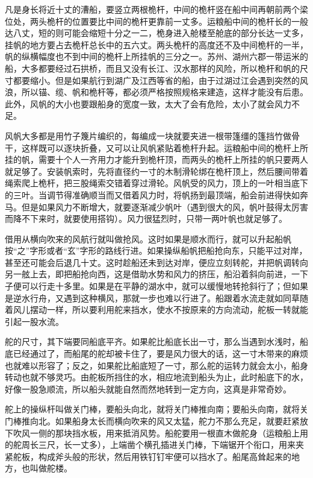 \documentclass[12pt,UTF8]{ctexbook}
\begin{document}
凡是身长将近十丈的漕船，要竖立两根桅杆，中间的桅杆竖在船中间再朝前两个梁位处，两头桅杆的位置要比中间的桅杆更靠前一丈多。运粮船中间的桅杆长的一般达八丈，短的则可能会缩短十分之一二，桅身进入舱楼至舱底的部分长达一丈多，挂帆的地方要占去桅杆总长中的五六丈。两头桅杆的高度还不及中间桅杆的一半，帆的纵横幅度也不到中间的桅杆上所挂帆的三分之一。苏州、湖州六郡一带运米的船，大多都要经过石拱桥，而且又没有长江、汉水那样的风险，所以桅杆和帆的尺寸都要缩小。但是如果航行到湖广及江西等省的船，由于过湖过江会遇到突然的风浪，所以锚、缆、帆和桅杆等，都必须严格按照规格来建造，这样才能没有后患。此外，风帆的大小也要跟船身的宽度一致，太大了会有危险，太小了就会风力不足。

风帆大多都是用竹子篾片编织的，每编成一块就要夹进一根带篷缰的篷挡竹做骨干，这样既可以逐块折叠，又可以让风帆紧贴着桅杆升起。运粮船中间的桅杆上所挂的帆，需要十个人一齐用力才能升到桅杆顶，而两头的桅杆上所挂的帆只要两人就足够了。安装帆索时，先将直径约一寸的木制滑轮绑在桅杆顶上，然后腰间带着绳索爬上桅杆，把三股绳索交错着穿过滑轮。风帆受的风力，顶上的一叶相当底下的三叶。当调节得准确顺当而又借着风力时，将帆扬到最顶端，船会前进得快如奔马。但是如果风力不断增大，就要逐渐减少帆叶（遇到很大的风，帆叶鼓得太厉害而降不下来时，就要使用搭钩）。风力很猛烈时，只带一两叶帆也就足够了。

借用从横向吹来的风航行就叫做抢风。这时如果是顺水而行，就可以升起船帆按“之”字形或者“玄”字形的路线行进。如果操纵船帆把船抢向东，只能平过对岸，甚至还可能会后退几十丈。这时趁船还未到达对岸，便应立刻转舵，并把帆调转向另一舷上去，即把船抢向西，这是借助水势和风力的挤压，船沿着斜向前进，一下子便可以行走十多里。如果是在平静的湖水中，就可以缓慢地转抢斜行了；但如果是逆水行舟，又遇到这种横风，那就一步也难以行进了。船跟着水流走就如同草随着风儿摆动一样，所以要利用舵来挡水，使水不按原来的方向流动，舵板一转就能引起一股水流。

舵的尺寸，其下端要同船底平齐。如果舵比船底长出一寸，那么当遇到水浅时，船底已经通过了，而船尾的舵却被卡住了，要是风力很大的话，这一寸木带来的麻烦也就难以形容了；反之，如果舵比船底短了一寸，那么舵的运转力就会太小，船身转动也就不够灵巧。由舵板所挡住的水，相应地流到船头为止，此时船底下的水，好像一股急顺流，所以船头就能自然而然地转到一定方向，这真是非常奇妙。

舵上的操纵杆叫做关门棒，要船头向北，就将关门棒推向南；要船头向南，就将关门棒推向北。如果船身太长而横向吹来的风又太猛，舵力不那么充足，就要赶紧放下吹风一侧的那块挡水板，用来抵消风势。船舵要用一根直木做舵身（运粮船上用的舵周长三尺，长一丈多），上端凿个横孔插进关门棒，下端锯开个衔口，用来夹紧舵板，构成斧头般的形状，然后用铁钉钉牢便可以挡水了。船尾高耸起来的地方，也叫做舵楼。
\end{document}
